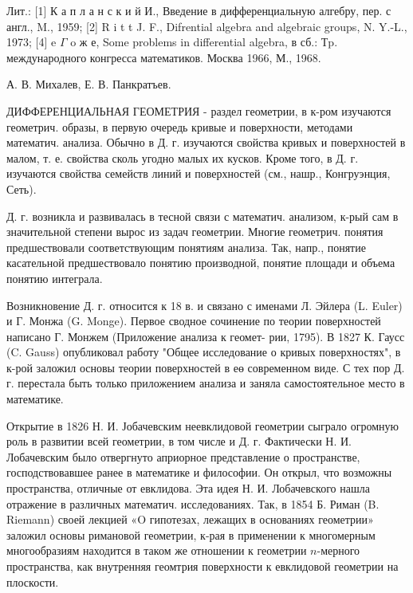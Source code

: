 \documentclass[10pt]{article}
\begin{document}
Лит.: [1] К а п л а н с к и й И., Введение в дифференциальную алгебру, пер. с англ., M., 1959; [2] R i t t J. F., Difrential algebra and algebraic groups, N. Y.-L., 1973; [4] e $\Gamma$ o ж е, Some problems in differential algebra, в сб.: Тp. международного конгресса математиков. Москва 1966, М., 1968.



А. В. Михалев, Е. В. Панкратъев.



ДИФФЕРЕНЦИАЛЬНАЯ ГЕОМЕТРИЯ - раздел геометрии, в к-ром изучаются геометрич. образы, в первую очередь кривые и поверхности, методами математич. анализа. Обычно в Д. г. изучаются свойства кривых и поверхностей в малом, т. е. свойства сколь угодно малых их кусков. Кроме того, в Д. г. изучаются свойства семейств линий и поверхностей (см., нашр., Конгруэнция, Сеть).



Д. г. возникла и развивалась в тесной связи с математич. анализом, к-рый сам в значительной степени вырос из задач геометрии. Многие геометрич. понятия предшествовали соответствующим понятиям анализа. Так, напр., понятие касательной предшествовало понятию производной, понятие площади и объема понятию интеграла.



Возникновение Д. г. относится к 18 в. и связано с именами Л. Эйлера (L. Euler) и Г. Монжа (G. Monge). Первое сводное сочинение по теории поверхностей написано Г. Монжем (Приложение анализа к геомет- рии, 1795). В 1827 К. Гаусс (C. Gauss) опубликовал работу "Общее исследование о кривых поверхностях", в к-рой заложил основы теории поверхностей в еө современном виде. С тех пор Д. г. перестала быть только приложением анализа и заняла самостоятельное место в математике.



Открытие в 1826 Н. И. Јобачевским неевклидовой геометрии сыграло огромную роль в развитии всей геометрии, в том числе и Д. г. Фактически Н. И. Лобачевским было отвергнуто априорное представление о пространстве, господствовавшее ранее в математике и философии. Он открыл, что возможны пространства, отличные от евклидова. Эта идея Н. И. Лобачевского нашла отражение в различных математич. исследованиях. Так, в 1854 Б. Риман (B. Riemann) своей лекцией «O гипотезах, лежащих в основаниях геометрии» заложил основы римановой геометрии, к-рая в применении к многомерным многообразиям находится в таком же отношении к геометрии $n$-мерного пространства, как внутренняя геомтрия поверхности к евклидовой геометрии на плоскости.
\end{document}
